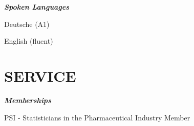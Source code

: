 \documentclass[13pt,]{article}
\providecommand{\tightlist}{%
  \setlength{\itemsep}{0pt}\setlength{\parskip}{0pt}}
\renewenvironment{itemize}{
  \begin{list}{}{
    \setlength{\leftmargin}{1.5em}
  }
}{
  \end{list}
}
\begin{document}
\emph{\textbf{Spoken Languages}}

\begin{itemize}
\tightlist
\item
  Deutsche (A1)
\item
  English (fluent)
\end{itemize}

\hypertarget{service}{%
\section{\texorpdfstring{\textbf{SERVICE}}{SERVICE}}\label{service}}

\emph{\textbf{Memberships}}

PSI - Statisticians in the Pharmaceutical Industry \hfill Member
\end{document}

